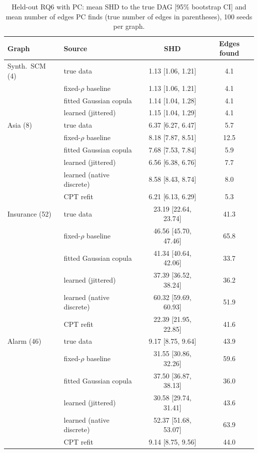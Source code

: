 \documentclass[
  english,
  class=report,
  accentcolor=2c,
  marginpar=false,
  parskip=half-,
  fontsize=11pt,
  ruledheaders=false,
  pdfa=false,
  IMRAD=false,
  thesis={type=master}
]{tudapub}
\begin{document}
\begin{table}[ht]
\caption{Held-out RQ6 with PC: mean SHD to the true DAG [95\% bootstrap CI] and mean number of edges PC finds (true number of edges in parentheses), 100 seeds per graph.}
\label{tab:shd-heldout}
\centering
\small
\begin{tabular}{llcc}
\toprule
\textbf{Graph} & \textbf{Source} & \textbf{SHD} & \textbf{Edges found} \\
\midrule
Synth.\ SCM (4) & true data & 1.13 [1.06, 1.21] & 4.1 \\
 & fixed-$\rho$ baseline & 1.13 [1.06, 1.21] & 4.1 \\
 & fitted Gaussian copula & 1.14 [1.04, 1.28] & 4.1 \\
 & learned (jittered) & 1.15 [1.04, 1.29] & 4.1 \\
\addlinespace
Asia (8) & true data & 6.37 [6.27, 6.47] & 5.7 \\
 & fixed-$\rho$ baseline & 8.18 [7.87, 8.51] & 12.5 \\
 & fitted Gaussian copula & 7.68 [7.53, 7.84] & 5.9 \\
 & learned (jittered) & 6.56 [6.38, 6.76] & 7.7 \\
 & learned (native discrete) & 8.58 [8.43, 8.74] & 8.0 \\
 & CPT refit & 6.21 [6.13, 6.29] & 5.3 \\
\addlinespace
Insurance (52) & true data & 23.19 [22.64, 23.74] & 41.3 \\
 & fixed-$\rho$ baseline & 46.56 [45.70, 47.46] & 65.8 \\
 & fitted Gaussian copula & 41.34 [40.64, 42.06] & 33.7 \\
 & learned (jittered) & 37.39 [36.52, 38.24] & 36.2 \\
 & learned (native discrete) & 60.32 [59.69, 60.93] & 51.9 \\
 & CPT refit & 22.39 [21.95, 22.85] & 41.6 \\
\addlinespace
Alarm (46) & true data & 9.17 [8.75, 9.64] & 43.9 \\
 & fixed-$\rho$ baseline & 31.55 [30.86, 32.26] & 59.6 \\
 & fitted Gaussian copula & 37.50 [36.87, 38.13] & 36.0 \\
 & learned (jittered) & 30.58 [29.74, 31.41] & 43.6 \\
 & learned (native discrete) & 52.37 [51.68, 53.07] & 63.9 \\
 & CPT refit & 9.14 [8.75, 9.56] & 44.0 \\
\bottomrule
\end{tabular}
\end{table}
\end{document}
